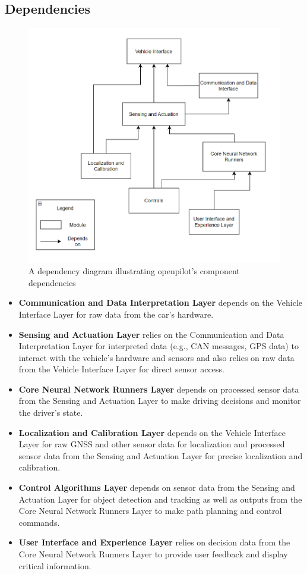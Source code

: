 \documentclass[12pt]{article}
\begin{document}
\subsection{Dependencies}

\begin{figure}[ht]
    \includegraphics[scale=1]{Assets/dependencies.png}
    \centering
    \caption{A dependency diagram illustrating openpilot's component dependencies}
    \label{fig:enter-label}
\end{figure}

\begin{itemize}
    \item \textbf{Communication and Data Interpretation Layer} depends on the Vehicle Interface Layer for raw data from the car's hardware.
    \item \textbf{Sensing and Actuation Layer} relies on the Communication and Data Interpretation Layer for interpreted data (e.g., CAN messages, GPS data) to interact with the vehicle’s hardware and sensors and also relies on raw data from the Vehicle Interface Layer for direct sensor access.
    \item \textbf{Core Neural Network Runners Layer} depends on processed sensor data from the Sensing and Actuation Layer to make driving decisions and monitor the driver's state.
    \item \textbf{Localization and Calibration Layer} depends on the Vehicle Interface Layer for raw GNSS and other sensor data for localization and processed sensor data from the Sensing and Actuation Layer for precise localization and calibration.
    \item \textbf{Control Algorithms Layer} depends on sensor data from the Sensing and Actuation Layer for object detection and tracking as well as outputs from the Core Neural Network Runners Layer to make path planning and control commands.
    \item \textbf{User Interface and Experience Layer} relies on decision data from the Core Neural Network Runners Layer to provide user feedback and display critical information.
\end{itemize}
\end{document}
